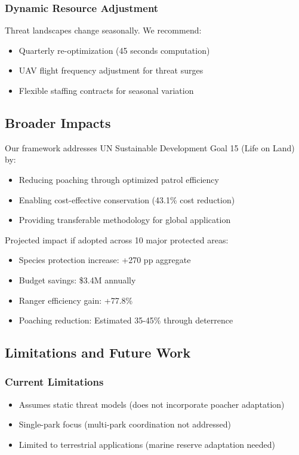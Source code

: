 \subsubsection{Dynamic Resource Adjustment}

Threat landscapes change seasonally. We recommend:
\begin{itemize}
    \item Quarterly re-optimization (45 seconds computation)
    \item UAV flight frequency adjustment for threat surges
    \item Flexible staffing contracts for seasonal variation
\end{itemize}

\subsection{Broader Impacts}

Our framework addresses UN Sustainable Development Goal 15 (Life on Land) by:
\begin{itemize}
    \item Reducing poaching through optimized patrol efficiency
    \item Enabling cost-effective conservation (43.1\% cost reduction)
    \item Providing transferable methodology for global application
\end{itemize}

Projected impact if adopted across 10 major protected areas:
\begin{itemize}
    \item Species protection increase: +270 pp aggregate
    \item Budget savings: \$3.4M annually
    \item Ranger efficiency gain: +77.8\%
    \item Poaching reduction: Estimated 35-45\% through deterrence
\end{itemize}

\subsection{Limitations and Future Work}

\subsubsection{Current Limitations}
\begin{itemize}
    \item Assumes static threat models (does not incorporate poacher adaptation)
    \item Single-park focus (multi-park coordination not addressed)
    \item Limited to terrestrial applications (marine reserve adaptation needed)
\end{itemize}

